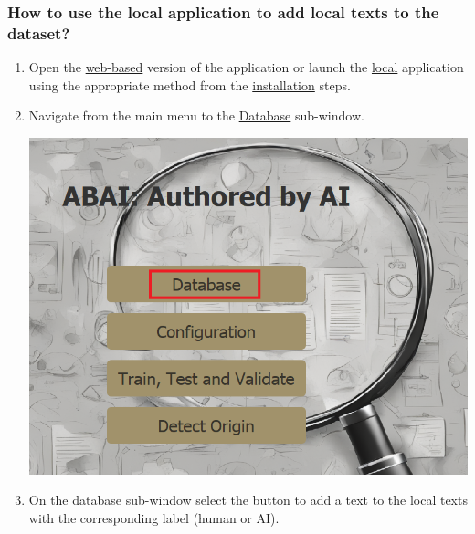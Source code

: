 \subsubsection{How to use the local application to add local texts to the dataset?}
\begin{enumerate}
    \item Open the \hyperref[subsubsec:Web application]{web-based} version of the application or launch the \hyperref[subsubsec:Local application]{local} application using the appropriate method from the \hyperref[subsec:First steps]{installation} steps.
    \item Navigate from the main menu to the \hyperref[subsubsec:database]{Database} sub-window.
    \begin{center}
        \includegraphics[width=16cm]{Images/Usage/Demo/navigate-database.png}
    \end{center}
    \item On the database sub-window select the button to add a text to the local texts with the corresponding label (human or AI).
    \begin{center}

\end{center}
\end{enumerate}

